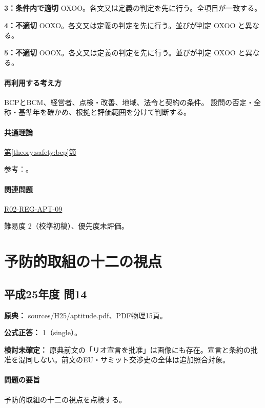 \noindent\textbf{3：条件内で適切} OXOO。各文又は定義の判定を先に行う。全項目が一致する。\par

\noindent\textbf{4：不適切} OOXO。各文又は定義の判定を先に行う。並びが判定 OXOO と異なる。\par

\noindent\textbf{5：不適切} OOOX。各文又は定義の判定を先に行う。並びが判定 OXOO と異なる。\par

\paragraph{再利用する考え方} BCPとBCM、経営者、点検・改善、地域、法令と契約の条件。 設問の否定・全称・基準年を確かめ、根拠と評価範囲を分けて判断する。

\paragraph{共通理論} \hyperref[theory:safety:bcp]{第\ref*{theory:safety:bcp}節}

\par 参考：\cite{eth54_bcp2021}。

\paragraph{関連問題} \hyperref[q:r02-reg-apt-09]{R02-REG-APT-09}

\par 難易度 2（校準初稿）、優先度未評価。

\section{予防的取組の十二の視点}

\subsection{平成25年度 問14}
\label{q:h25-reg-apt-14}

\noindent\textbf{原典：} sources/H25/aptitude.pdf、PDF物理15頁。

\textbf{公式正答：} 1（single）。

\par\textbf{検討未確定：} 原典前文の「リオ宣言を批准」は画像にも存在。宣言と条約の批准を混同しない。前文のEU・サミット交渉史の全体は追加照合対象。

\paragraph{問題の要旨} 予防的取組の十二の視点を点検する。

